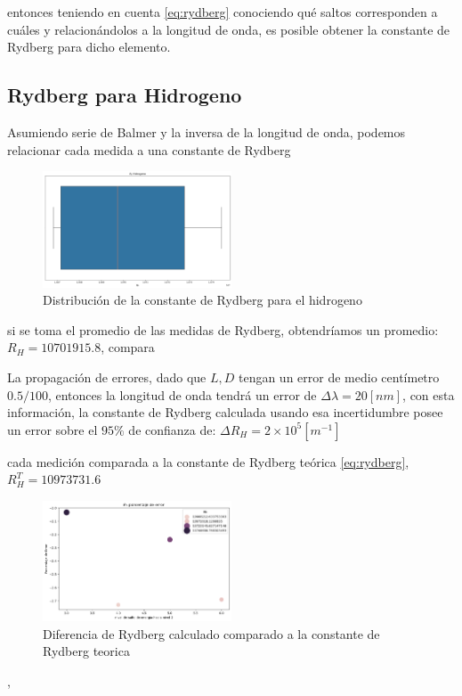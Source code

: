 \documentclass[a4paper,twocolumn,10pt]{article}
\begin{document}
entonces teniendo en cuenta \ref{eq:rydberg} conociendo qué saltos corresponden a cuáles y relacionándolos a la longitud de onda, es posible obtener la constante de Rydberg para dicho elemento.

\subsection{Rydberg para Hidrogeno}
Asumiendo serie de Balmer y la inversa de la longitud de onda, podemos relacionar cada medida a una constante de Rydberg
\begin{figure}[H]
    \centering
    \includegraphics[width=0.5\textwidth]{Plots/Rydberg/Rh.png}
    \caption{Distribución de la constante de Rydberg para el hidrogeno}
    \label{plot:Rh}
\end{figure}
si se toma el promedio de las medidas de Rydberg, obtendríamos un promedio: $R_H = 10 701 915.8$, compara


La propagación de errores, dado que $L, D$ tengan un error de medio centímetro $0.5/100$, entonces la longitud de onda tendrá un error de $\Delta \lambda = 20 [nm]$, con esta información, la constante de Rydberg calculada usando esa incertidumbre posee un error sobre el $95\%$ de confianza de: $\Delta R_H = 2 \times 10^5 [m^{-1}]$

cada medición comparada a la constante de Rydberg teórica \ref{eq:rydberg}, $R^T_H = 10 973 731.6$
\begin{figure}[H]
    \centering
    \includegraphics[width=0.5\textwidth]{Plots/Rydberg/porcntErrorPorSalto.png}
    \caption{Diferencia de Rydberg calculado comparado a la constante de Rydberg teorica}
    \label{plot:RhError}
\end{figure},
\end{document}
